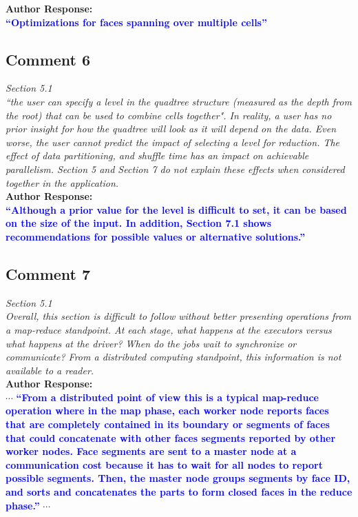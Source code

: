 \documentclass[10pt]{article}
\begin{document}
\textbf{Author Response:}\\

\textbf{\textcolor{blue}{
``Optimizations for faces spanning over multiple cells''
}}

\subsection*{Comment 6}
\textit{
Section 5.1\\
``the user can specify a level in the quadtree structure (measured as the depth from the root) that can be used to combine cells together". In reality, a user has no prior insight for how the quadtree will look as it will depend on the data. Even worse, the user cannot predict the impact of selecting a level for reduction. The effect of data partitioning, and shuffle time has an impact on achievable parallelism. Section 5 and Section 7 do not explain these effects when considered together in the application.
} \\

\textbf{Author Response:}\\

\textbf{\textcolor{blue}{
``Although a prior value for the level is difficult to set, it can be based on the size of the input.  In addition,  Section 7.1 shows recommendations for possible values or alternative solutions.''
}}

\subsection*{Comment 7}
\textit{
Section 5.1\\
Overall, this section is difficult to follow without better presenting operations from a map-reduce standpoint. At each stage, what happens at the executors versus what happens at the driver? When do the jobs wait to synchronize or communicate? From a distributed computing standpoint, this information is not available to a reader.
} \\


\textbf{Author Response:}\\

$\cdots$
\textbf{\textcolor{blue}{``From a distributed point of view this is a typical map-reduce operation where in the map phase, each worker node reports faces that are completely contained in its boundary or segments of faces that could concatenate with other faces segments reported by other worker nodes.
Face segments are sent to a master node at a communication cost because it has to wait for all nodes to report possible segments.  Then, the master node groups segments by face ID, and sorts and concatenates the parts to form closed faces in the reduce phase.''}}
$\cdots$
\end{document}
